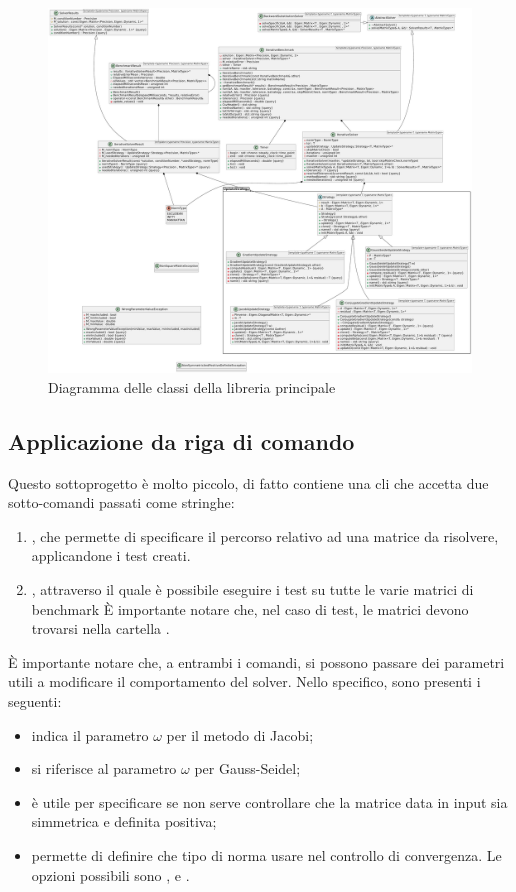 \begin{figure}
	\centering
	\includegraphics[width=\textwidth]{figures/libDiagram.pdf}
	\caption{Diagramma delle classi della libreria principale}
	\label{fig:libdiagram}
\end{figure}

\subsection{Applicazione da riga di comando} \label{sec:cli}
Questo sottoprogetto è molto piccolo, di fatto contiene una cli che accetta due sotto-comandi passati come stringhe:

\begin{enumerate}
	\item {}, che permette di specificare il percorso relativo ad una matrice da risolvere, applicandone i test creati.
	\item {}, attraverso il quale è possibile eseguire i test su tutte le varie matrici di benchmark È importante notare che, nel caso di test, le matrici devono trovarsi nella cartella .
\end{enumerate}

È importante notare che, a entrambi i comandi, si possono passare dei parametri utili a modificare il comportamento del solver. Nello specifico, sono presenti i seguenti:

\begin{itemize}
	\item {} indica il parametro $\omega$ per il metodo di Jacobi;
	\item {} si riferisce al parametro $\omega$ per Gauss-Seidel;
	\item {} è utile per specificare se non serve controllare che la matrice data in input sia simmetrica e definita positiva;
	\item {} permette di definire che tipo di norma usare nel controllo di convergenza. Le opzioni possibili sono ,  e .
\end{itemize}

